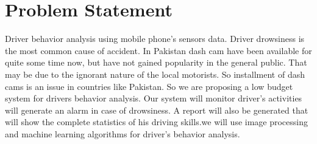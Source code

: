 \chapter{Problem Statement}
 Driver behavior analysis using mobile phone’s sensors data.
Driver drowsiness is the most common cause of accident. In Pakistan dash cam have been
available for quite some time now, but have not gained popularity in the general public. That
may be due to the ignorant nature of the local motorists. So installment of dash cams is an issue
in countries like Pakistan.
So we are proposing a low budget system for drivers behavior analysis. Our system will monitor
driver’s activities will generate an alarm in case of drowsiness. A report will also be generated
that will show the complete statistics of his driving skills.we will use image processing and
machine learning algorithms for driver’s behavior analysis.


